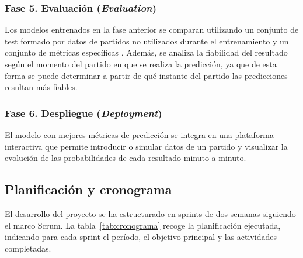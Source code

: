 \subsubsection{Fase 5. Evaluación (\textit{Evaluation})}
Los modelos entrenados en la fase anterior se comparan utilizando un conjunto de test formado por datos de partidos no utilizados durante el entrenamiento y un conjunto de métricas específicas \citep{sokolova2009metrics}. Además, se analiza la fiabilidad del resultado según el momento del partido en que se realiza la predicción, ya que de esta forma se puede determinar a partir de qué instante del partido las predicciones resultan más fiables.

\subsubsection{Fase 6. Despliegue (\textit{Deployment})}
El modelo con mejores métricas de predicción se integra en una plataforma interactiva que permite introducir o simular datos de un partido y visualizar la evolución de las probabilidades de cada resultado minuto a minuto.

\subsection{Planificación y cronograma}

El desarrollo del proyecto se ha estructurado en sprints de dos semanas siguiendo el marco Scrum. La tabla~\ref{tab:cronograma} recoge la planificación ejecutada, indicando para cada sprint el período, el objetivo principal y las actividades completadas.

